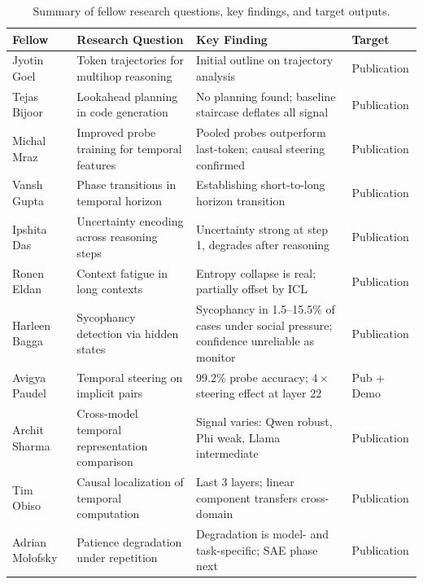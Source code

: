 \documentclass[final]{sparreport}
\begin{document}
\begin{table}[htbp]
\centering
\small
\begin{tabular}{p{2.2cm}p{4.5cm}p{4.5cm}p{2cm}}
\toprule
\textbf{Fellow} & \textbf{Research Question} & \textbf{Key Finding} & \textbf{Target} \\
\midrule
Jyotin Goel & Token trajectories for multihop reasoning & Initial outline on trajectory analysis & Publication \\
Tejas Bijoor & Lookahead planning in code generation & No planning found; baseline staircase deflates all signal & Publication \\
Michal Mraz & Improved probe training for temporal features & Pooled probes outperform last-token; causal steering confirmed & Publication \\
Vansh Gupta & Phase transitions in temporal horizon & Establishing short-to-long horizon transition & Publication \\
Ipshita Das & Uncertainty encoding across reasoning steps & Uncertainty strong at step 1, degrades after reasoning & Publication \\
Ronen Eldan & Context fatigue in long contexts & Entropy collapse is real; partially offset by ICL & Publication \\
Harleen Bagga & Sycophancy detection via hidden states & Sycophancy in 1.5--15.5\% of cases under social pressure; confidence unreliable as monitor & Publication \\
Avigya Paudel & Temporal steering on implicit pairs & 99.2\% probe accuracy; $4\times$ steering effect at layer 22 & Pub + Demo \\
Archit Sharma & Cross-model temporal representation comparison & Signal varies: Qwen robust, Phi weak, Llama intermediate & Publication \\
Tim Obiso & Causal localization of temporal computation & Last 3 layers; linear component transfers cross-domain & Publication \\
Adrian Molofsky & Patience degradation under repetition & Degradation is model- and task-specific; SAE phase next & Publication \\
\bottomrule
\end{tabular}
\caption{Summary of fellow research questions, key findings, and target outputs.}
\label{tab:fellows}
\end{table}

\end{document}
